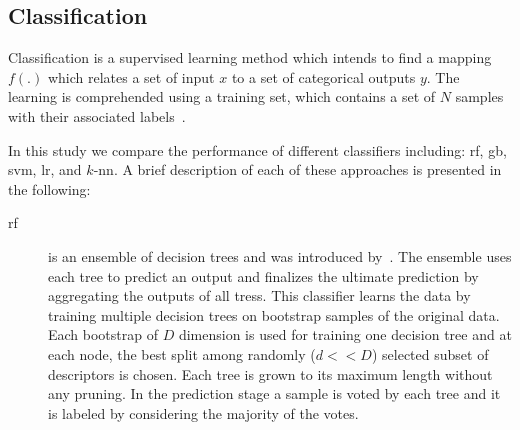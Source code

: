 \subsection{Classification}\label{subsec:cls}
Classification is a supervised learning method which intends to find a mapping $f(.)$ which relates a set of input $x$ to a set of categorical outputs $y$.
The learning is comprehended using a training set, which contains a set of $N$ samples with their associated labels~\cite{murphy2012machine}.

In this study we compare the performance of different classifiers including: \ac{rf}, \ac{gb}, \ac{svm}, \ac{lr}, and $k$-\ac{nn}.
A brief description of each of these approaches is presented in the following:

\begin{description}
\item[\acl{rf}] is an ensemble of decision trees and was introduced by~\cite{breiman2001random}.
The ensemble uses each tree to predict an output and finalizes the ultimate prediction by aggregating the outputs of all tress. 
This classifier learns the data by training multiple decision trees on bootstrap samples of the original data. 
Each bootstrap of $D$ dimension is used for training one decision tree and at each node, the best split among randomly ($d << D$) selected subset of descriptors is chosen. 
Each tree is grown to its maximum length without any pruning. 
In the prediction stage a sample is voted by each tree and it is labeled by considering the majority of the votes.\\


\end{description}
